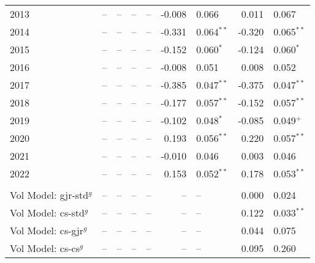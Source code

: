 \begin{table}
\begin{tabular}{l r l r l r l r l}
        2013                               &      -- & --           &      -- & --           &  -0.008 & 0.066        &   0.011 & 0.067         \\
        2014                               &      -- & --           &      -- & --           &  -0.331 & 0.064$^{**}$ &  -0.320 & 0.065$^{**}$  \\
        2015                               &      -- & --           &      -- & --           &  -0.152 & 0.060$^{*}$  &  -0.124 & 0.060$^{*}$   \\
        2016                               &      -- & --           &      -- & --           &  -0.008 & 0.051        &   0.008 & 0.052         \\
        2017                               &      -- & --           &      -- & --           &  -0.385 & 0.047$^{**}$ &  -0.375 & 0.047$^{**}$  \\
        2018                               &      -- & --           &      -- & --           &  -0.177 & 0.057$^{**}$ &  -0.152 & 0.057$^{**}$  \\
        2019                               &      -- & --           &      -- & --           &  -0.102 & 0.048$^{*}$  &  -0.085 & 0.049$^{+}$   \\
        2020                               &      -- & --           &      -- & --           &   0.193 & 0.056$^{**}$ &   0.220 & 0.057$^{**}$  \\
        2021                               &      -- & --           &      -- & --           &  -0.010 & 0.046        &   0.003 & 0.046         \\
        2022                               &      -- & --           &      -- & --           &   0.153 & 0.052$^{**}$ &   0.178 & 0.053$^{**}$  \\  \\
        Vol Model: gjr-std$^{g}$           &      -- & --           &      -- & --           &      -- & --           &   0.000 & 0.024         \\
        Vol Model: cs-std$^{g}$            &      -- & --           &      -- & --           &      -- & --           &   0.122 & 0.033$^{**}$  \\
        Vol Model: cs-gjr$^{g}$            &      -- & --           &      -- & --           &      -- & --           &   0.044 & 0.075         \\
        Vol Model: cs-cs$^{g}$             &      -- & --           &      -- & --           &      -- & --           &   0.095 & 0.260         \\

\end{tabular}
\end{table}
